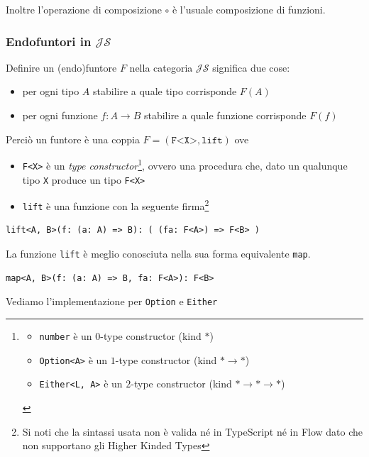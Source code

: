 \documentclass[12pt]{article}
\begin{document}
Inoltre l'operazione di composizione $\circ$ è l'usuale composizione di funzioni.

\subsubsection{Endofuntori in $\mathcal{JS}$}

Definire un (endo)funtore $F$ nella categoria $\mathcal{JS}$ significa due cose:

\begin{itemize}
  \item per ogni tipo $A$ stabilire a quale tipo corrisponde $F(A)$
  \item per ogni funzione $f: A \rightarrow B$ stabilire a quale funzione corrisponde $F(f)$
\end{itemize}

Perciò un funtore è una coppia $F = (\texttt{F<X>}, \texttt{lift})$ ove

\begin{itemize}
  \item \texttt{F<X>} è un \emph{type constructor}\footnote{
    \begin{itemize}
      \item \texttt{number} è un $0$-type constructor (kind $*$)
      \item \texttt{Option<A>} è un $1$-type constructor (kind $* \rightarrow *$)
      \item \texttt{Either<L, A>} è un $2$-type constructor (kind $* \rightarrow * \rightarrow *$)
    \end{itemize}
  }, ovvero una procedura che, dato un qualunque tipo \texttt{X} produce un tipo \texttt{F<X>}
  \item \texttt{lift} è una funzione con la seguente firma\footnote{Si noti che la sintassi usata non è valida né in TypeScript né in Flow dato che non supportano gli Higher Kinded Types}
\end{itemize}

\begin{verbatim}
lift<A, B>(f: (a: A) => B): ( (fa: F<A>) => F<B> )
\end{verbatim}

La funzione \texttt{lift} è meglio conosciuta nella sua forma equivalente \texttt{map}.

\begin{verbatim}
map<A, B>(f: (a: A) => B, fa: F<A>): F<B>
\end{verbatim}

Vediamo l'implementazione per \texttt{Option} e \texttt{Either}
\end{document}
